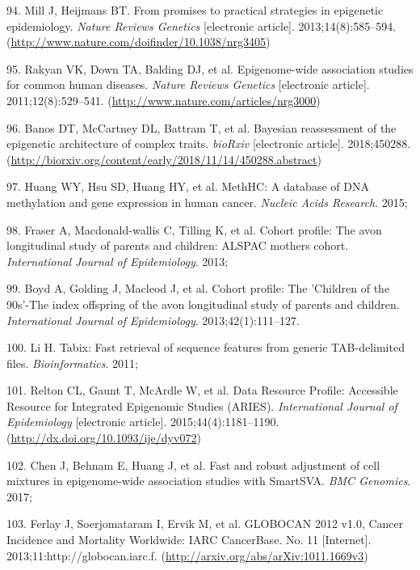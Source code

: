 \documentclass[11pt,twoside]{bristolthesis}
\newenvironment{cslreferences}%
  {}%
  {\par}
\begin{document}
\begin{cslreferences}
\leavevmode\hypertarget{ref-Mill2013}{}%
94. Mill J, Heijmans BT. From promises to practical strategies in epigenetic epidemiology. \emph{Nature Reviews Genetics} {[}electronic article{]}. 2013;14(8):585--594. (\url{http://www.nature.com/doifinder/10.1038/nrg3405})

\leavevmode\hypertarget{ref-Rakyan2011}{}%
95. Rakyan VK, Down TA, Balding DJ, et al. Epigenome-wide association studies for common human diseases. \emph{Nature Reviews Genetics} {[}electronic article{]}. 2011;12(8):529--541. (\url{http://www.nature.com/articles/nrg3000})

\leavevmode\hypertarget{ref-Banos2018}{}%
96. Banos DT, McCartney DL, Battram T, et al. Bayesian reassessment of the epigenetic architecture of complex traits. \emph{bioRxiv} {[}electronic article{]}. 2018;450288. (\url{http://biorxiv.org/content/early/2018/11/14/450288.abstract})

\leavevmode\hypertarget{ref-Huang2015}{}%
97. Huang WY, Hsu SD, Huang HY, et al. MethHC: A database of DNA methylation and gene expression in human cancer. \emph{Nucleic Acids Research}. 2015;

\leavevmode\hypertarget{ref-Fraser2013}{}%
98. Fraser A, Macdonald-wallis C, Tilling K, et al. Cohort profile: The avon longitudinal study of parents and children: ALSPAC mothers cohort. \emph{International Journal of Epidemiology}. 2013;

\leavevmode\hypertarget{ref-Boyd2013}{}%
99. Boyd A, Golding J, Macleod J, et al. Cohort profile: The 'Children of the 90s'-The index offspring of the avon longitudinal study of parents and children. \emph{International Journal of Epidemiology}. 2013;42(1):111--127.

\leavevmode\hypertarget{ref-Li2011}{}%
100. Li H. Tabix: Fast retrieval of sequence features from generic TAB-delimited files. \emph{Bioinformatics}. 2011;

\leavevmode\hypertarget{ref-Relton2015}{}%
101. Relton CL, Gaunt T, McArdle W, et al. Data Resource Profile: Accessible Resource for Integrated Epigenomic Studies (ARIES). \emph{International Journal of Epidemiology} {[}electronic article{]}. 2015;44(4):1181--1190. (\url{http://dx.doi.org/10.1093/ije/dyv072})

\leavevmode\hypertarget{ref-Chen2017}{}%
102. Chen J, Behnam E, Huang J, et al. Fast and robust adjustment of cell mixtures in epigenome-wide association studies with SmartSVA. \emph{BMC Genomics}. 2017;

\leavevmode\hypertarget{ref-Ferlay2013}{}%
103. Ferlay J, Soerjomataram I, Ervik M, et al. GLOBOCAN 2012 v1.0, Cancer Incidence and Mortality Worldwide: IARC CancerBase. No. 11 {[}Internet{]}. 2013;11:http://globocan.iarc.f. (\url{http://arxiv.org/abs/arXiv:1011.1669v3})


\end{cslreferences}
\end{document}
